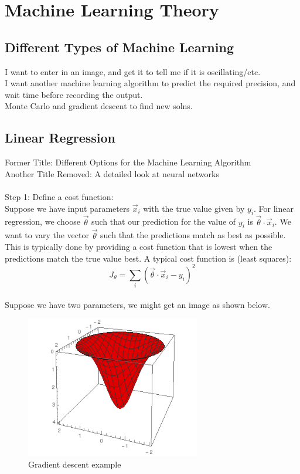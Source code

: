 \documentclass[a4paper,12pt]{report}
\begin{document}
\chapter{Machine Learning Theory}
\section{Different Types of Machine Learning}
I want to enter in an image, and get it to tell me if it is oscillating/etc.\\
I want another machine learning algorithm to predict the required precision, and wait time before recording the output.\\
Monte Carlo and gradient descent to find new solns.\\
\section{Linear Regression}
Former Title: Different Options for the Machine Learning Algorithm\\
Another Title Removed: A detailed look at neural networks\\
\\
Step 1: Define a cost function:\\
Suppose we have input parameters $\vec x_i$ with the true value given by $y_i$. For linear regression, we choose $\vec\theta$ such that our prediction for the value of $y_i$ is $\vec\theta \cdot \vec x_i$. We want to vary the vector $\vec \theta$ such that the predictions match as best as possible. This is typically done by providing a cost function that is lowest when the predictions match the true value best. A typical cost function is (least squares):
$$J_\theta = \sum_i \left(\vec\theta\cdot \vec x_i -y_i\right)^2 $$
\\
Suppose we have two parameters, we might get an image as shown below. 
\begin{figure}[h]
\centering
\includegraphics[width=3in]{GradDescent}
\caption{Gradient descent example}
\label{corr} 
\end{figure}
\end{document}
